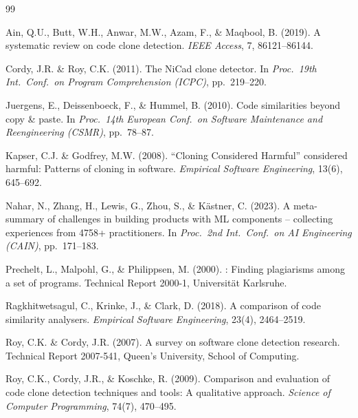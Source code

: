 \documentclass[smallextended,natbib]{svjour3}
\begin{document}
\begin{thebibliography}{99}

Ain, Q.U., Butt, W.H., Anwar, M.W., Azam, F., \& Maqbool, B. (2019).
\newblock A systematic review on code clone detection.
\newblock \emph{IEEE Access}, 7, 86121--86144.

Cordy, J.R. \& Roy, C.K. (2011).
\newblock The {NiCad} clone detector.
\newblock In \emph{Proc.\ 19th Int.\ Conf.\ on Program Comprehension (ICPC)}, pp.\ 219--220.

Juergens, E., Deissenboeck, F., \& Hummel, B. (2010).
\newblock Code similarities beyond copy \& paste.
\newblock In \emph{Proc.\ 14th European Conf.\ on Software Maintenance and Reengineering (CSMR)}, pp.\ 78--87.

Kapser, C.J. \& Godfrey, M.W. (2008).
\newblock ``{Cloning Considered Harmful}'' considered harmful: Patterns of cloning in software.
\newblock \emph{Empirical Software Engineering}, 13(6), 645--692.

Nahar, N., Zhang, H., Lewis, G., Zhou, S., \& K\"{a}stner, C. (2023).
\newblock A meta-summary of challenges in building products with {ML} components -- collecting experiences from 4758+ practitioners.
\newblock In \emph{Proc.\ 2nd Int.\ Conf.\ on AI Engineering (CAIN)}, pp.\ 171--183.

Prechelt, L., Malpohl, G., \& Philippsen, M. (2000).
: Finding plagiarisms among a set of programs.
\newblock Technical Report 2000-1, Universit\"{a}t Karlsruhe.

Ragkhitwetsagul, C., Krinke, J., \& Clark, D. (2018).
\newblock A comparison of code similarity analysers.
\newblock \emph{Empirical Software Engineering}, 23(4), 2464--2519.

Roy, C.K. \& Cordy, J.R. (2007).
\newblock A survey on software clone detection research.
\newblock Technical Report 2007-541, Queen's University, School of Computing.

Roy, C.K., Cordy, J.R., \& Koschke, R. (2009).
\newblock Comparison and evaluation of code clone detection techniques and tools: A qualitative approach.
\newblock \emph{Science of Computer Programming}, 74(7), 470--495.


\end{thebibliography}
\end{document}
